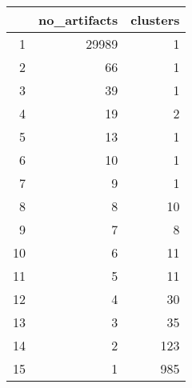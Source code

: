 \begin{table}[ht]
\centering
\begin{tabular}{rrr}
  \hline
 & no\_artifacts & clusters \\ 
  \hline
1 & 29989 &   1 \\ 
  2 &  66 &   1 \\ 
  3 &  39 &   1 \\ 
  4 &  19 &   2 \\ 
  5 &  13 &   1 \\ 
  6 &  10 &   1 \\ 
  7 &   9 &   1 \\ 
  8 &   8 &  10 \\ 
  9 &   7 &   8 \\ 
  10 &   6 &  11 \\ 
  11 &   5 &  11 \\ 
  12 &   4 &  30 \\ 
  13 &   3 &  35 \\ 
  14 &   2 & 123 \\ 
  15 &   1 & 985 \\ 
   \hline
\end{tabular}
\end{table}

